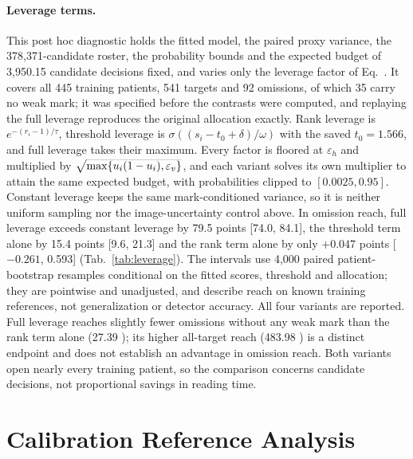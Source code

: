 \paragraph{Leverage terms.}
This post hoc diagnostic holds the fitted model, the paired proxy variance, the 378,371-candidate roster, the probability bounds and the expected budget of 3,950.15 candidate decisions fixed, and varies only the leverage factor of Eq.~. It covers all 445 training patients, 541 targets and 92 omissions, of which 35 carry no weak mark; it was specified before the contrasts were computed, and replaying the full leverage reproduces the original allocation exactly. Rank leverage is $e^{-(r_i-1)/\tau}$, threshold leverage is $\sigma((s_i-t_0+\delta)/\omega)$ with the saved $t_0=1.566$, and full leverage takes their maximum. Every factor is floored at $\varepsilon_h$ and multiplied by $\smash[t]{\sqrt{\max\{u_i(1-u_i),\varepsilon_v\}}}$, and each variant solves its own multiplier to attain the same expected budget, with probabilities clipped to $[0.0025, 0.95]$. Constant leverage keeps the same mark-conditioned variance, so it is neither uniform sampling nor the image-uncertainty control above. In omission reach, full leverage exceeds constant leverage by 79.5 points [74.0, 84.1], the threshold term alone by 15.4 points [9.6, 21.3] and the rank term alone by only $+0.047$ points [$-0.261$, 0.593] (Tab.~\ref{tab:leverage}). The intervals use 4,000 paired patient-bootstrap resamples conditional on the fitted scores, threshold and allocation; they are pointwise and unadjusted, and describe reach on known training references, not generalization or detector accuracy. All four variants are reported. Full leverage reaches slightly fewer omissions without any weak mark than the rank term alone (27.39 ); its higher all-target reach (483.98 ) is a distinct endpoint and does not establish an advantage in omission reach. Both variants open nearly every training patient, so the comparison concerns candidate decisions, not proportional savings in reading time.

\vfill
\section{Calibration Reference Analysis}
\label{sec:s-ref}

